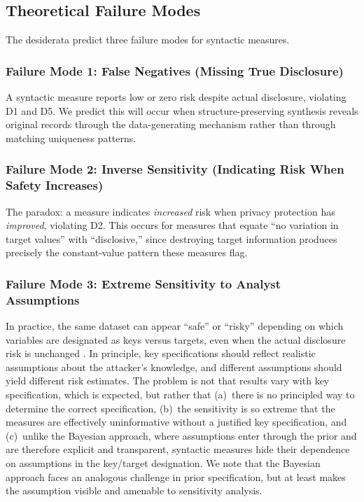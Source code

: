 \documentclass[Afour,sageh,times,doublespace]{sagej}
\begin{document}
\subsection{Theoretical Failure Modes}
\label{sec:failure}

The desiderata predict three failure modes for syntactic measures.

\subsubsection{Failure Mode 1: False Negatives (Missing True Disclosure)}
\label{sec:failure:false_negatives}

A syntactic measure reports low or zero risk despite actual disclosure, violating D1 and D5. We predict this will occur when structure-preserving synthesis reveals original records through the data-generating mechanism rather than through matching uniqueness patterns.

\subsubsection{Failure Mode 2: Inverse Sensitivity (Indicating Risk When Safety Increases)}
\label{sec:failure:inverse_sensitivity}

The paradox: a measure indicates \textit{increased} risk when privacy protection has \textit{improved}, violating D2. This occurs for measures that equate ``no variation in target values'' with ``disclosive,'' since destroying target information produces precisely the constant-value pattern these measures flag.

\subsubsection{Failure Mode 3: Extreme Sensitivity to Analyst Assumptions}
\label{sec:failure:arbitrary}

In practice, the same dataset can appear ``safe'' or ``risky'' depending on which variables are designated as keys versus targets, even when the actual disclosure risk is unchanged \citep{Aggarwal2005, Sweeney2002}. In principle, key specifications should reflect realistic assumptions about the attacker's knowledge, and different assumptions should yield different risk estimates. The problem is not that results vary with key specification, which is expected, but rather that (a)~there is no principled way to determine the correct specification, (b)~the sensitivity is so extreme that the measures are effectively uninformative without a justified key specification, and (c)~unlike the Bayesian approach, where assumptions enter through the prior and are therefore explicit and transparent, syntactic measures hide their dependence on assumptions in the key/target designation. We note that the Bayesian approach faces an analogous challenge in prior specification, but at least makes the assumption visible and amenable to sensitivity analysis.
\end{document}
